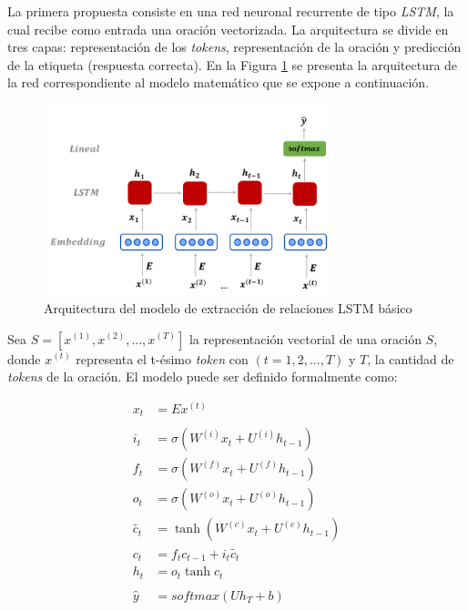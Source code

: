 La primera propuesta consiste en una red neuronal recurrente de tipo \textit{LSTM}, la cual recibe como entrada una oración vectorizada. La arquitectura se divide en tres capas: representación de los \textit{tokens}, representación de la oración y predicción de la etiqueta (respuesta correcta). En la Figura \ref{lstm} se presenta la arquitectura de la red correspondiente al modelo matemático que se expone a continuación.

\begin{figure}[!tb]
  \begin{center}    
    \includegraphics[angle=0, width=0.75\textwidth]{Graphics/lstm2.png} 
  \end{center}
    \caption{Arquitectura del modelo de extracción de relaciones LSTM básico}\label{lstm}
\end{figure}

Sea $S = [x^{(1)}, x^{(2)}, ..., x^{(T)}]$ la representación vectorial de una oración $S$, donde $x^{(t)}$ representa el t-ésimo \textit{token} con $(t = 1, 2, ..., T)$ y $T$, la cantidad de \textit{tokens} de la oración. El modelo puede ser definido formalmente como:

\begin{align}
  x_{t} &= Ex^{(t)} \label{lstm:emb} \\
  \nonumber \\
  i_{t} &= \sigma{(W^{(i)} x_{t} + U^{(i)}h_{t-1})} \label{lstm:ig} \\
  f_{t} &= \sigma{(W^{(f)} x_{t} + U^{(f)}h_{t-1})} \label{lstm:fg} \\
  o_{t} &= \sigma{(W^{(o)} x_{t} + U^{(o)}h_{t-1})} \label{lstm:og} \\
  \tilde{c_{t}} &= \tanh(W^{(c)} x_{t} + U^{(c)}h_{t-1}) \label{lstm:new_memory_generation} \\
  c_{t} &= f_{t}c_{t-1} + i_{t}\tilde{c_{t}} \label{lstm:cell_state} \\
  h_{t} &= o_{t}\tanh{c_{t}} \label{lstm:hidden_state} \\
  \nonumber \\
  \hat{y} &= softmax(Uh_{T} + b) \label{lstm:pred}
\end{align}

